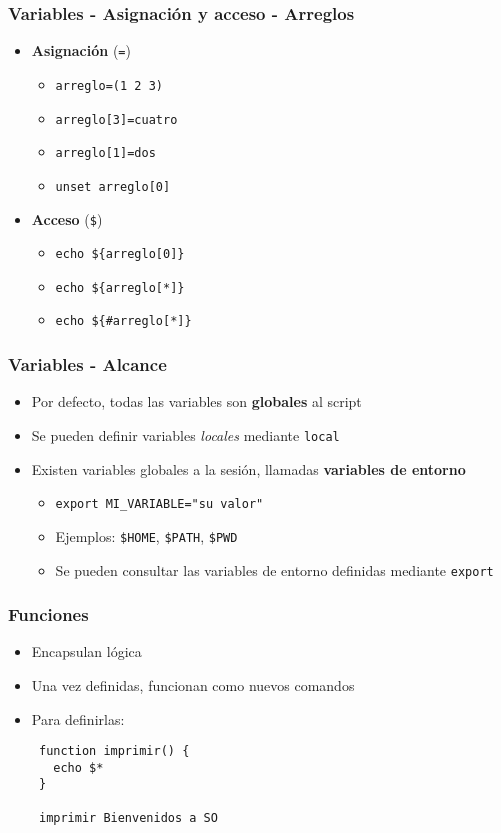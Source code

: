 \begin{frame}
  \frametitle{Variables - Asignación y acceso - Arreglos}
  \begin{itemize}
    \item \textbf{Asignación} (\texttt{=})
    \begin{itemize}
      \item \texttt{arreglo=(1 2 3)}
      \item \texttt{arreglo[3]=cuatro}
      \item \texttt{arreglo[1]=dos}
      \item \texttt{unset arreglo[0]}
    \end{itemize}
    \item \textbf{Acceso} (\texttt{\${}})
    \begin{itemize}
      \item \texttt{echo \$\{arreglo[0]\}}
      \item \texttt{echo \$\{arreglo[*]\}}
      \item \texttt{echo \$\{\#arreglo[*]\}}
    \end{itemize}
  \end{itemize}
\end{frame}

\begin{frame}
  \frametitle{Variables - Alcance}
  \begin{itemize}
    \item Por defecto, todas las variables son \textbf{globales} al script
    \item Se pueden definir variables \textit{locales} mediante \texttt{local}
    \item Existen variables globales a la sesión, llamadas \textbf{variables de entorno}
    \begin{itemize}
      \item \texttt{export MI\_VARIABLE=\string"su valor\string"}
      \item Ejemplos: \texttt{\$HOME}, \texttt{\$PATH}, \texttt{\$PWD}
      \item Se pueden consultar las variables de entorno definidas mediante \texttt{export}
    \end{itemize}
  \end{itemize}
\end{frame}

\begin{frame}[fragile]
  \frametitle{Funciones}
  \begin{itemize}
    \item Encapsulan lógica
    \item Una vez definidas, funcionan como nuevos comandos
    \item Para definirlas:
   \begin{lstlisting}
 function imprimir() {
   echo $*
 }

 imprimir Bienvenidos a SO
   \end{lstlisting}
  \end{itemize}
\end{frame}

